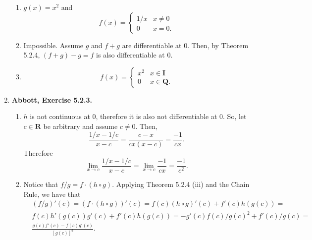 \documentclass{article}
\newcommand{\Q}{\mathbf{Q}}
\newcommand{\I}{\mathbf{I}}
\newcommand{\R}{\mathbf{R}}
\newcommand{\exc}[2][Abbott]{\item \textbf{#1, Exercise #2.}}
\begin{document}
\begin{enumerate}
\begin{enumerate}
        \item $g(x) = x^2$ and 
        \begin{equation*}
            f(x) = 
            \begin{cases}
                1/x & x \neq 0 \\ 
                0 & x = 0.
            \end{cases}
        \end{equation*}
        
        \item Impossible. Assume $g$ and $f + g$ are differentiable at $0$. Then, by Theorem 5.2.4, $(f+g) - g = f$ is also differentiable at $0$.
        
        \item \begin{equation*}
            f(x) = 
            \begin{cases}
                x^2 & x \in \I \\ 
                0 & x \in \Q.
            \end{cases}
        \end{equation*}
    \end{enumerate}
    
    \exc{5.2.3}
    \begin{enumerate}
        \item $h$ is not continuous at $0$, therefore it is also not differentiable at $0$. So, let $c \in \R$ be arbitrary and assume $c \neq 0$. Then, 
        \begin{equation*}
            \frac{1/x-1/c}{x-c} = \frac{c-x}{c x(x-c)} = \frac{-1}{c x}.
        \end{equation*} Therefore 
        \begin{equation*}
            \lim_{x \to c} \frac{1/x-1/c}{x-c} = \lim_{x \to c} \frac{-1}{c x} = \frac{-1}{c^2}.
        \end{equation*}
        
        \item Notice that $f/g = f \cdot (h \circ g)$. Applying Theorem 5.2.4 (iii) and the Chain Rule, we have that 
        \begin{align*}
            &(f/g)'(c) = (f \cdot (h \circ g))'(c) = f(c) (h \circ g)'(c) + f'(c) h(g(c))=\\
            &f(c) h'(g(c)) g'(c) + f'(c) h(g(c)) = -g'(c)f(c)/g(c)^2 + f'(c)/g(c) = \\
            & \frac{g(c) f'(c) - f(c) g'(c)}{[g(c)]^2}.
        \end{align*}
        

\end{enumerate}
\end{enumerate}
\end{document}
